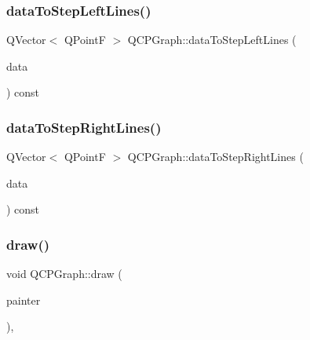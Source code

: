 \mbox{\label{class_q_c_p_graph_a1f3e9e41fc67538c4940c74665840474}} 
\subsubsection{\texorpdfstring{data\+To\+Step\+Left\+Lines()}{dataToStepLeftLines()}}
{\footnotesize\ttfamily Q\+Vector$<$ Q\+PointF $>$ Q\+C\+P\+Graph\+::data\+To\+Step\+Left\+Lines (\begin{DoxyParamCaption}\item[{const Q\+Vector$<$ \hyperlink{class_q_c_p_graph_data}{Q\+C\+P\+Graph\+Data} $>$ \&}]{data }\end{DoxyParamCaption}) const\hspace{0.3cm}{\ttfamily [protected]}}

\mbox{\label{class_q_c_p_graph_ab1fb6cb91d24a854f85bf54200f6d101}} 
\subsubsection{\texorpdfstring{data\+To\+Step\+Right\+Lines()}{dataToStepRightLines()}}
{\footnotesize\ttfamily Q\+Vector$<$ Q\+PointF $>$ Q\+C\+P\+Graph\+::data\+To\+Step\+Right\+Lines (\begin{DoxyParamCaption}\item[{const Q\+Vector$<$ \hyperlink{class_q_c_p_graph_data}{Q\+C\+P\+Graph\+Data} $>$ \&}]{data }\end{DoxyParamCaption}) const\hspace{0.3cm}{\ttfamily [protected]}}

\mbox{\label{class_q_c_p_graph_a2b0849598f06e834b43ce18cd13bcdc3}} 
\subsubsection{\texorpdfstring{draw()}{draw()}}
{\footnotesize\ttfamily void Q\+C\+P\+Graph\+::draw (\begin{DoxyParamCaption}\item[{\hyperlink{class_q_c_p_painter}{Q\+C\+P\+Painter} $\ast$}]{painter }\end{DoxyParamCaption})\hspace{0.3cm}{\ttfamily [protected]}, {\ttfamily [virtual]}}



